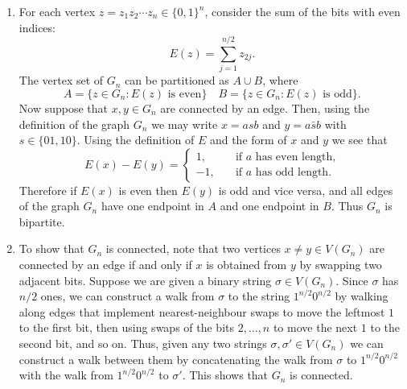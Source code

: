 \begin{enumerate}
    
    \newpage
    \begin{enumerate}
        \item For each vertex $z=z_1z_2\cdots z_n \in \{0,1\}^n$, consider the sum of the bits with even indices:
        \[E(z) = \sum_{j=1}^{n/2}z_{2j}.\]
        The vertex set of $G_n$ can be partitioned as $A\cup B$, where 
        \[A = \{z \in G_n: E(z) \text{ is even}\} \quad B = \{z \in G_n: E(z) \text{ is odd}\}.\]
        Now suppose that $x,y \in G_n$ are connected by an edge. Then, using the definition of the graph $G_n$ we may write $x=asb$ and $y=a\bar{s}b$ with $s \in \{01, 10\}$. Using the definition of $E$ and the form of $x$ and $y$ we see that
        \[E(x) - E(y) = \begin{cases}
            1, \quad &\text{if $a$ has even length,}\\
            -1, \quad &\text{if $a$ has odd length.}
        \end{cases}\]
        Therefore if $E(x)$ is even then $E(y)$ is odd and vice versa, and all edges of the graph $G_n$ have one endpoint in $A$ and one endpoint in $B$. Thus $G_n$ is bipartite.
        \item To show that $G_n$ is connected, note that two vertices $x\neq y \in V(G_n)$ are connected by an edge if and only if $x$ is obtained from $y$ by swapping two adjacent bits. Suppose we are given a binary string $\sigma \in V(G_n)$. Since $\sigma$ has $n/2$ ones, we can construct a walk from $\sigma$ to the string $1^{n/2}0^{n/2}$ by walking along edges that implement nearest-neighbour swaps to move the leftmost $1$ to the first bit, then using swaps of the bits $2, \dots, n$ to move the next $1$ to the second bit, and so on. Thus, given any two strings $\sigma, \sigma' \in V(G_n)$ we can construct a walk between them by concatenating the walk from $\sigma$ to $1^{n/2}0^{n/2}$ with the walk from $1^{n/2}0^{n/2}$ to $\sigma'$. This shows that $G_n$ is connected.
    \end{enumerate}

   
\end{enumerate}